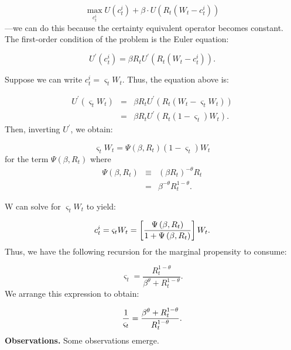 \documentclass{article}
\begin{document}
\begin{equation*}
\max_{c_{t}^{i}}U\left( c_{t}^{i}\right) +\beta \cdot U\left( R_{t}\left(
W_{t}-c_{t}^{i}\right) \right)
\end{equation*}%
---we can do this because the certainty equivalent operator becomes
constant. The first-order condition of the problem is the Euler equation:

\begin{equation*}
U^{\prime }\left( c_{t}^{i}\right) =\beta R_{t}U^{\prime }\left( R_{t}\left(
W_{t}-c_{t}^{i}\right) \right) .
\end{equation*}

Suppose we can write $c_{t}^{i}=\varsigma _{t}W_{t}.$ Thus, the equation
above is:

\begin{eqnarray*}
U^{\prime }\left( \varsigma _{t}W_{t}\right) &=&\beta R_{t}U^{\prime }\left(
R_{t}\left( W_{t}-\varsigma _{t}W_{t}\right) \right) \\
&=&\beta R_{t}U^{\prime }\left( R_{t}\left( 1-\varsigma _{t}\right)
W_{t}\right) .
\end{eqnarray*}%
Then, inverting $U^{\prime }$, we obtain:

\begin{equation*}
\varsigma _{t}W_{t}=\Psi \left( \beta ,R_{t}\right) \left( 1-\varsigma
_{t}\right) W_{t}
\end{equation*}%
for the term $\Psi \left( \beta ,R_{t}\right) $ where%
\begin{eqnarray*}
\Psi \left( \beta ,R_{t}\right) &\equiv &\left( \beta R_{t}\right) ^{-\theta
}R_{t} \\
&=&\beta ^{-\theta }R_{t}^{1-\theta }.
\end{eqnarray*}

W can solve for $\varsigma _{t}W_{t}$ to yield:

\begin{equation*}
c_{t}^{i}=\varsigma _{t}W_{t}=\left[ \frac{\Psi \left( \beta ,R_{t}\right) }{%
1+\Psi \left( \beta ,R_{t}\right) }\right] W_{t}.
\end{equation*}%
Thus, we have the following recursion for the marginal propensity to consume:

\begin{equation*}
\varsigma _{t}=\frac{R_{t}^{1-\theta }}{\beta ^{\theta }+R_{t}^{1-\theta }}.
\end{equation*}%
We arrange this expression to obtain:

\begin{equation*}
\frac{1}{\varsigma _{t}}=\frac{\beta ^{\theta }+R_{t}^{1-\theta }}{%
R_{t}^{1-\theta }}.
\end{equation*}%
\textbf{Observations.} Some observations emerge.
\end{document}
